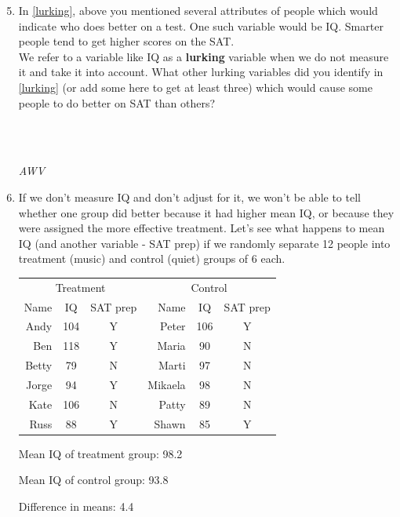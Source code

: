 \begin{enumerate}
  \setcounter{enumi}{4}
  \item In \ref{lurking}, above you mentioned several attributes of
    people which would indicate who does better on a test.  One such
    variable would be IQ.  Smarter people tend to get higher scores on
    the SAT.  
    \\ We refer to a variable like IQ as a {\bf lurking} variable when
    we do not measure it and take it into account.  What other lurking
    variables did you identify in \ref{lurking} (or add some here to
    get at least three)
    which would cause some people to do better on SAT than others?
\begin{students}
        \vspace{1cm}\\
\end{students}
\begin{key}
  \\ {\it  AWV}
\end{key}
  \item  If we don't measure IQ and don't adjust for it, we won't be
    able to tell whether one group did better because it had higher
    mean IQ, or because they were assigned the more effective treatment.  
    Let's see what happens to mean IQ (and another variable - SAT
    prep) if we randomly separate 12
    people into treatment (music) and  control (quiet) groups of 6 each.

    
\begin{tabular}{|r|c|c||r|c|c|}\hline
      \multicolumn{3}{|c||}{Treatment} &\multicolumn{3}{|c|}{Control}\\
  Name  & IQ & SAT prep & Name & IQ &SAT prep \\
\hline
Andy & 104 & Y &Peter &106 &Y\\
\hline
Ben  & 118 & Y & Maria & 90 &N\\
\hline
Betty & 79 & N & Marti & 97 &N \\
\hline
Jorge & 94 & Y & Mikaela& 98 &N\\
\hline
 Kate  & 106&N &  Patty &89 &N\\
\hline
Russ  &  88 &Y & Shawn &85 &Y\\ \hline
\end{tabular} \hfill
\begin{minipage}{.40\linewidth}
  Mean IQ of treatment group: 98.2

  Mean IQ of control group: 93.8

  Difference in means:  4.4
\end{minipage}


\end{enumerate}
